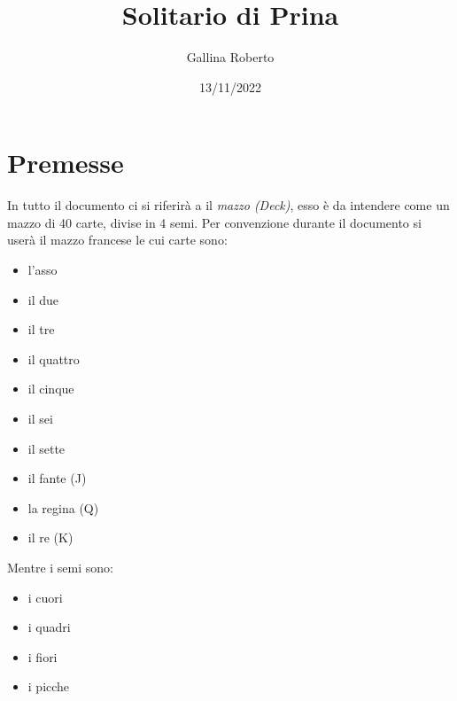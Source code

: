 \documentclass[a4paper]{article}
\begin{document}
\begin{titlepage}
    \title{Solitario di Prina}
    \author{Gallina Roberto}
    \date{13/11/2022}
    \maketitle
\end{titlepage}

\newpage

\tableofcontents

\newpage

\section{Premesse}
In tutto il documento ci si riferirà a il \emph{mazzo (Deck)}, esso è da intendere come un mazzo di 40 carte, divise in 4 semi. Per convenzione durante il documento si userà il mazzo francese le cui carte sono:

\begin{itemize}
    \item l'asso
    \item il due
    \item il tre
    \item il quattro
    \item il cinque
    \item il sei
    \item il sette
    \item il fante (J)
    \item la regina (Q)
    \item il re (K)
\end{itemize}

\noindent
Mentre i semi sono:

\begin{itemize}
    \item i cuori
    \item i quadri
    \item i fiori
    \item i picche
\end{itemize}
\end{document}
